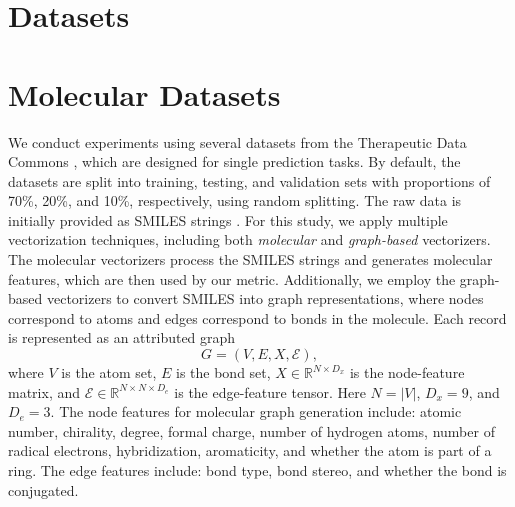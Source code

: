 \section{Datasets}
\label{appendix:Datasets}

\section{Molecular Datasets} 
\label{appendix:molecular_datasets}

We conduct experiments using several datasets from the Therapeutic Data Commons \cite{huang2021tdc}, which are designed for single prediction tasks. By default, the datasets are split into training, testing, and validation sets with proportions of 70\%, 20\%, and 10\%, respectively, using random splitting. The raw data is initially provided as SMILES strings \cite{weininger1988smiles}. For this study, we apply multiple vectorization techniques, including both \textit{molecular} and \textit{graph-based} vectorizers.
The molecular vectorizers process the SMILES strings and generates molecular features, which are then used by our metric. Additionally, we employ the graph-based vectorizers to convert SMILES into graph representations, where nodes correspond to atoms and edges correspond to bonds in the molecule.
Each record is represented as an attributed graph
\[
G=(V,E,X,\mathcal E),
\]
where $V$ is the atom set, $E$ is the bond set, $X\in\mathbb{R}^{N\times D_x}$
is the node-feature matrix, and
$\mathcal E\in\mathbb{R}^{N\times N\times D_e}$ is the edge-feature tensor.
Here $N=|V|$, $D_x=9$, and $D_e=3$.
The node features for molecular graph generation include: atomic number, chirality, degree, formal charge, number of hydrogen atoms, number of radical electrons, hybridization, aromaticity, and whether the atom is part of a ring. The edge features include: bond type, bond stereo, and whether the bond is conjugated.\cite{pyg_graphgym_encoder}

